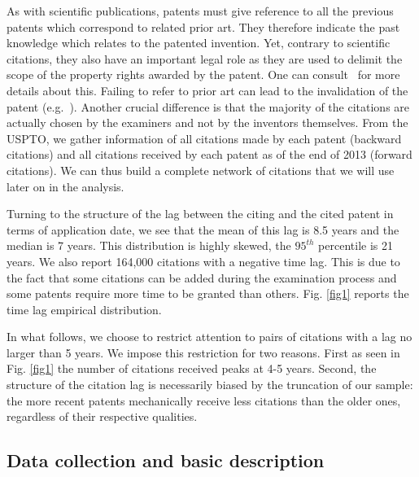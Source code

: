 \documentclass[10pt,A4]{article}
\begin{document}
As with scientific publications, patents must give reference to all the previous patents which correspond to related prior art. They therefore indicate the past knowledge which relates to the patented invention. Yet, contrary to scientific citations, they also have an important legal role as they are used to delimit the scope of the property rights awarded by the patent. One can consult~\cite{oecdpatentmanual} for more details about this. Failing to refer to prior art can lead to the invalidation of the patent (e.g.~\cite{martin2015}). Another crucial difference is that the majority of the citations are actually chosen by the  examiners and not by the inventors themselves. 
From the USPTO, we gather information of all citations made by each patent (backward citations) and all citations received by each patent as of the end of 2013 (forward citations). We can thus build a complete network of citations that we will use later on in the analysis.

Turning to the structure of the lag between the citing and the cited patent in terms of application date, we see that the mean of this lag is 8.5 years and the median is 7 years. This distribution is highly skewed, the $95^{th}$ percentile is 21 years. We also report 164,000 citations with a negative time lag. This is due to the fact that some citations can be added during the examination process and some patents require more time to be granted than others. Fig. \ref{fig1} reports the time lag empirical distribution.

In what follows, we choose to restrict attention to pairs of citations with a lag no larger than 5 years. We impose this restriction for two reasons. First as seen in Fig. \ref{fig1} the number of citations received peaks at 4-5 years. Second, the structure of the citation lag is necessarily biased by the truncation of our sample: the more recent patents mechanically receive less citations than the older ones, regardless of their respective qualities.

\subsection{Data collection and basic description}
\end{document}
